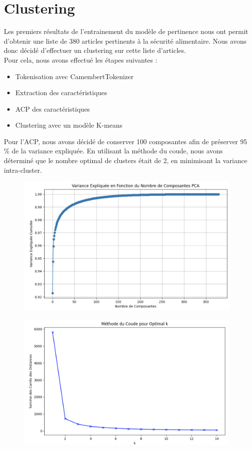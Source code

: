 \documentclass{article}
\begin{document}
\section{Clustering}

Les premiers résultats de l'entrainement du modèle de pertinence nous ont permit d'obtenir une liste de 380 articles pertinents à la sécurité alimentaire. Nous avons donc décidé d'effectuer un clustering sur cette liste d'articles. \\

Pour cela, nous avons effectué les étapes suivantes : 
\begin{itemize}
    \item Tokenisation avec CamembertTokenizer
    \item Extraction des caractéristiques
    \item ACP des caractéristiques
    \item Clustering avec un modèle K-means
\end{itemize}

Pour l'ACP, nous avons décidé de conserver 100 composantes afin de préserver 95 \% de la variance expliquée. En utilisant la méthode du coude, nous avons déterminé que le nombre optimal de clusters était de 2, en minimisant la variance intra-cluster.

\begin{figure}[h]
    \centering
    \begin{minipage}{.5\textwidth}
        \centering
        \includegraphics[width=0.75\linewidth]{var.png}
        \label{fig: Variance Expliquée en Fonction du Nombre de Composantes PCA}
    \end{minipage}%
    \begin{minipage}{.5\textwidth}
        \centering
        \includegraphics[width=0.8\linewidth]{kopt.png}
        \label{fig: Méthode du Coude}
    \end{minipage}
\end{figure}
\end{document}
